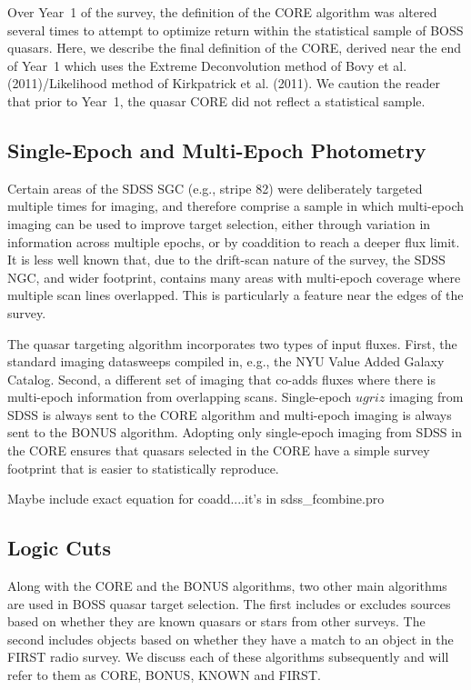 \documentclass{emulateapj}
\begin{document}
Over Year~1 of the survey, the definition of the CORE algorithm was altered several times to attempt to optimize return within the statistical sample of BOSS quasars. Here, we describe the final definition of the CORE, derived near the end of Year~1 which uses the Extreme Deconvolution method of Bovy et al. (2011)/Likelihood method of Kirkpatrick et al. (2011). We caution the reader that prior to Year~1, the quasar CORE did not reflect a statistical sample.

\subsection{Single-Epoch and Multi-Epoch Photometry}
\label{sec:epochs}


Certain areas of the SDSS SGC (e.g., stripe 82) were deliberately targeted multiple times for imaging, and therefore comprise a sample in which multi-epoch imaging can be used to improve target selection, either through variation in information across multiple epochs, or by coaddition to reach a deeper flux limit. It is less well known that, due to the drift-scan nature of the survey, the SDSS NGC, and wider footprint, contains many areas with multi-epoch coverage where multiple scan lines overlapped. This is particularly a feature near the edges of the survey.

The quasar targeting algorithm incorporates two types of input fluxes. First, the standard imaging datasweeps compiled in, e.g., the NYU Value Added Galaxy Catalog. Second, a different set of imaging that co-adds fluxes where there is multi-epoch information from overlapping scans. Single-epoch $ugriz$ imaging from SDSS is always sent to the CORE algorithm and multi-epoch imaging is always sent to the BONUS algorithm. Adopting only single-epoch imaging from SDSS in the CORE ensures that quasars selected in the CORE have a simple survey footprint that is easier to statistically reproduce.

Maybe include exact equation for coadd....it's in sdss\_fcombine.pro

\subsection{Logic Cuts}
\label{sec:logic}

Along with the CORE and the BONUS algorithms, two other main algorithms
are used in BOSS quasar target selection. The first includes or excludes
sources based on whether they are known quasars or stars from other
surveys. The second includes objects based on whether they have a
match to an object in the FIRST radio survey. We discuss each of these
algorithms subsequently and will refer to them as CORE, BONUS, KNOWN and
FIRST.
\end{document}
